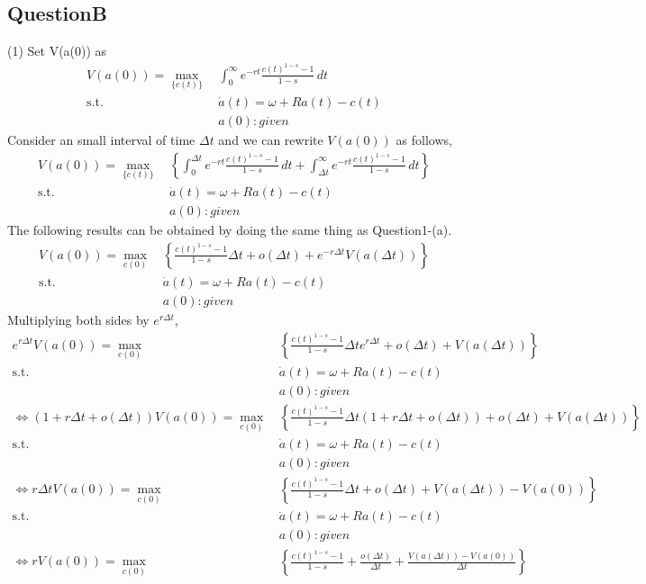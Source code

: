 \documentclass{article}
\begin{document}
\begin{CJK}{UTF8}{min}
\section*{QuestionB}
(1)\quad
Set V(a(0)) as
\begin{align*}
V(a(0))=\max_{\{c(t)\}} \, &\int_0^\infty e^{-rt}\frac{c(t)^{1-s}-1}{1-s}\,dt\\
\mathrm{s.t.} \,\,&\dot a(t)=\omega+Ra(t)-c(t)\\
&a(0):given
\end{align*}
Consider an small interval of time $\Delta t$ and we can rewrite $V(a(0))$ as follows, 
\begin{align*}
V(a(0))=\max_{\{c(t)\}} \, &\left\{\int_0^{\Delta t} e^{-rt}\frac{c(t)^{1-s}-1}{1-s}\,dt+\int_{\Delta t}^\infty e^{-rt}\frac{c(t)^{1-s}-1}{1-s}\,dt\right\}\\
\mathrm{s.t.} \,\,&\dot a(t)=\omega+Ra(t)-c(t)\\
&a(0):given
\end{align*}
The following results can be obtained by doing the same thing as Question1-(a).
\begin{align*}
V(a(0))=\max_{c(0)} \, &\left\{\frac{c(t)^{1-s}-1}{1-s}\Delta t+o(\Delta t)+e^{-r\Delta t}V(a(\Delta t))\right\}\\
\mathrm{s.t.} \,\,&\dot a(t)=\omega+Ra(t)-c(t)\\
&a(0):given
\end{align*}
Multiplying both sides by $e^{r\Delta t}$,
\begin{align*}
e^{r\Delta t}V(a(0))=\max_{c(0)} \, &\left\{\frac{c(t)^{1-s}-1}{1-s}\Delta te^{r\Delta t}+o(\Delta t)+V(a(\Delta t))\right\}\\
\mathrm{s.t.} \,\,&\dot a(t)=\omega+Ra(t)-c(t)\\
&a(0):given\\
\Leftrightarrow (1+r\Delta t+o(\Delta t))V(a(0))=\max_{c(0)} \, &\left\{\frac{c(t)^{1-s}-1}{1-s}\Delta t(1+r\Delta t+o(\Delta t))+o(\Delta t)+V(a(\Delta t))\right\}\\
\mathrm{s.t.} \,\,&\dot a(t)=\omega+Ra(t)-c(t)\\
&a(0):given\\
\Leftrightarrow r\Delta t V(a(0))=\max_{c(0)} \, &\left\{\frac{c(t)^{1-s}-1}{1-s}\Delta t+o(\Delta t)+V(a(\Delta t))-V(a(0))\right\}\\
\mathrm{s.t.} \,\,&\dot a(t)=\omega+Ra(t)-c(t)\\
&a(0):given\\
\Leftrightarrow rV(a(0))=\max_{c(0)} \, &\left\{\frac{c(t)^{1-s}-1}{1-s}+\frac{o(\Delta t)}{\Delta t}+\frac{V(a(\Delta t))-V(a(0))}{\Delta t}\right\}\\

\end{align*}
\end{CJK}
\end{document}
